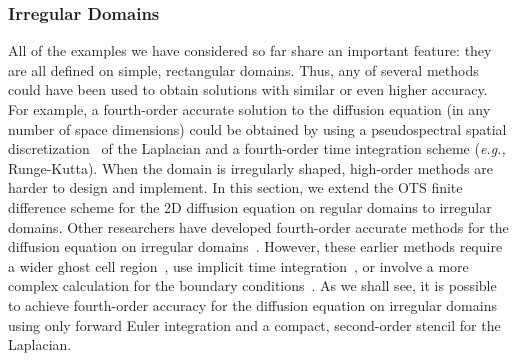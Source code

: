 \documentclass[fleqn,12pt,twoside]{article}
\def\eg{\emph{e.g., }}
\begin{document}
\subsubsection{Irregular Domains}
All of the examples we have considered so far share an important feature: they 
are all defined on simple, rectangular domains.  Thus, any of several methods 
could have been used to obtain solutions with similar or even higher accuracy.
For example, a fourth-order accurate solution to the diffusion equation
(in any number of space dimensions) could be obtained by using a 
pseudospectral spatial 
discretization~\cite{trefethen_spectral_book,boyd_spectral_book} 
of the Laplacian and a fourth-order time integration scheme 
(\eg Runge-Kutta).  When the domain is irregularly shaped, high-order methods 
are harder to design and implement.  
In this section, we extend the OTS finite difference scheme for the 2D 
diffusion equation on regular domains to irregular domains.  Other 
researchers have developed fourth-order accurate methods for the diffusion 
equation on irregular domains~\cite{gibou_2005,ito_2005}.  However, these 
earlier methods require a wider ghost cell region~\cite{gibou_2005}, use
implicit time integration~\cite{gibou_2005,ito_2005}, or involve a more 
complex calculation for the boundary conditions~\cite{ito_2005}.  As we shall 
see, it is possible to achieve fourth-order accuracy for the diffusion 
equation on irregular domains using only forward Euler integration and a 
compact, second-order stencil for the Laplacian.
\end{document}
